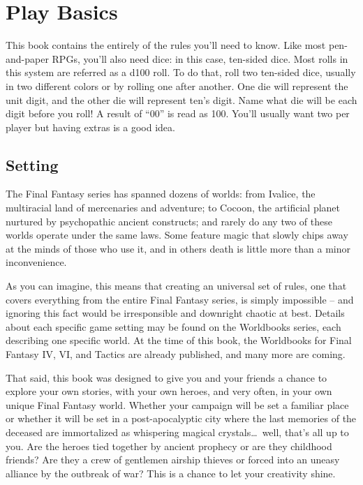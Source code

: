 \section{Play Basics}\label{sec:basics}
\begin{multicols}{2} %
This book contains the entirely of the rules you'll need to know. Like most pen-and-paper RPGs, you'll also need dice: in this case, ten-sided dice. Most rolls in this system are referred as a d100 roll. To do that, roll two ten-sided dice, usually in two different colors or by rolling one after another. One die will represent the unit digit, and the other die will represent ten's digit. Name what die will be each digit before you roll! A result of “00” is read as 100. You’ll usually want two per player but having extras is a good idea.
\subsection{Setting}\label{subsec:setting}
The Final Fantasy series has spanned dozens of worlds: from Ivalice, the multiracial land of mercenaries and adventure; to Cocoon, the artificial planet nurtured by psychopathic ancient constructs; and rarely do any two of these worlds operate under the same laws. Some feature magic that slowly chips away at the minds of those who use it, and in others death is little more than a minor inconvenience.

As you can imagine, this means that creating an universal set of rules, one that covers everything from the entire Final Fantasy series, is simply impossible – and ignoring this fact would be irresponsible and downright chaotic at best. Details about each specific game setting may be found on the Worldbooks series, each describing one specific world. At the time of this book, the Worldbooks for Final Fantasy IV, VI, and Tactics are already published, and many more are coming.

That said, this book was designed to give you and your friends a chance to explore your own stories, with your own heroes, and very often, in your own unique Final Fantasy world. Whether your campaign will be set a familiar place or whether it will be set in a post-apocalyptic city where the last memories of the deceased are immortalized as whispering magical crystals\ldots{}\ well, that’s all up to you. Are the heroes tied together by ancient prophecy or are they childhood friends? Are they a crew of gentlemen airship thieves or forced into an uneasy alliance by the outbreak of war? This is a chance to let your creativity shine.

\end{multicols}
